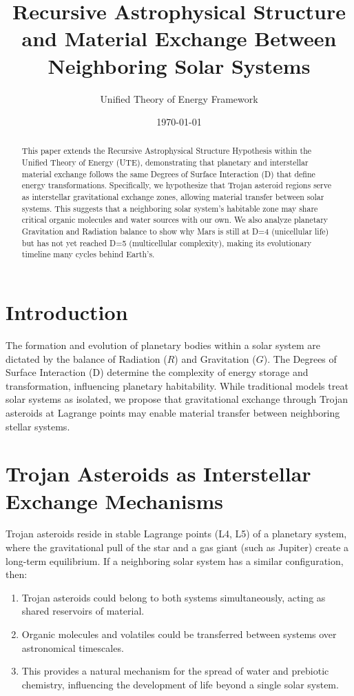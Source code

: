 \documentclass{article}
\title{Recursive Astrophysical Structure and Material Exchange Between Neighboring Solar Systems}
\author{Unified Theory of Energy Framework}
\date{\today}
\begin{document}
\maketitle

\begin{abstract}
This paper extends the Recursive Astrophysical Structure Hypothesis within the Unified Theory of Energy (UTE), demonstrating that planetary and interstellar material exchange follows the same Degrees of Surface Interaction (D) that define energy transformations. Specifically, we hypothesize that Trojan asteroid regions serve as interstellar gravitational exchange zones, allowing material transfer between solar systems. This suggests that a neighboring solar system's habitable zone may share critical organic molecules and water sources with our own. We also analyze planetary Gravitation and Radiation balance to show why Mars is still at D=4 (unicellular life) but has not yet reached D=5 (multicellular complexity), making its evolutionary timeline many cycles behind Earth's.
\end{abstract}

\section{Introduction}
The formation and evolution of planetary bodies within a solar system are dictated by the balance of Radiation ($R$) and Gravitation ($G$). The Degrees of Surface Interaction (D) determine the complexity of energy storage and transformation, influencing planetary habitability. While traditional models treat solar systems as isolated, we propose that gravitational exchange through Trojan asteroids at Lagrange points may enable material transfer between neighboring stellar systems.

\section{Trojan Asteroids as Interstellar Exchange Mechanisms}
Trojan asteroids reside in stable Lagrange points (L4, L5) of a planetary system, where the gravitational pull of the star and a gas giant (such as Jupiter) create a long-term equilibrium. If a neighboring solar system has a similar configuration, then:
\begin{enumerate}
    \item Trojan asteroids could belong to both systems simultaneously, acting as shared reservoirs of material.
    \item Organic molecules and volatiles could be transferred between systems over astronomical timescales.
    \item This provides a natural mechanism for the spread of water and prebiotic chemistry, influencing the development of life beyond a single solar system.
\end{enumerate}
\end{document}
